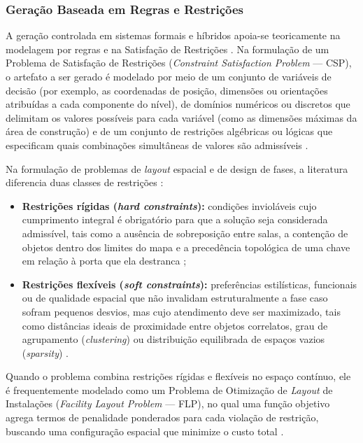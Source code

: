 \subsubsection{Geração Baseada em Regras e Restrições}
\label{sec:geracao_restricoes}

A geração controlada em sistemas formais e híbridos apoia-se teoricamente na modelagem por regras e na Satisfação de Restrições \cite{tanagra, linden2014dungeons, pcgbook, xu2025constraint}. Na formulação de um Problema de Satisfação de Restrições (\textit{Constraint Satisfaction Problem} --- CSP), o artefato a ser gerado é modelado por meio de um conjunto de variáveis de decisão (por exemplo, as coordenadas de posição, dimensões ou orientações atribuídas a cada componente do nível), de domínios numéricos ou discretos que delimitam os valores possíveis para cada variável (como as dimensões máximas da área de construção) e de um conjunto de restrições algébricas ou lógicas que especificam quais combinações simultâneas de valores são admissíveis \cite{tanagra, linden2014dungeons}.

Na formulação de problemas de \textit{layout} espacial e de design de fases, a literatura diferencia duas classes de restrições \cite{xu2025constraint, xu2025databasedrivenframework3dlevel}:
\begin{itemize}
    \item \textbf{Restrições rígidas (\textit{hard constraints}):} condições invioláveis cujo cumprimento integral é obrigatório para que a solução seja considerada admissível, tais como a ausência de sobreposição entre salas, a contenção de objetos dentro dos limites do mapa e a precedência topológica de uma chave em relação à porta que ela destranca \cite{tanagra, sun2024roomplanner, xu2025constraint};
    \item \textbf{Restrições flexíveis (\textit{soft constraints}):} preferências estilísticas, funcionais ou de qualidade espacial que não invalidam estruturalmente a fase caso sofram pequenos desvios, mas cujo atendimento deve ser maximizado, tais como distâncias ideais de proximidade entre objetos correlatos, grau de agrupamento (\textit{clustering}) ou distribuição equilibrada de espaços vazios (\textit{sparsity}) \cite{xu2025constraint, xu2025databasedrivenframework3dlevel}.
\end{itemize}

Quando o problema combina restrições rígidas e flexíveis no espaço contínuo, ele é frequentemente modelado como um Problema de Otimização de \textit{Layout} de Instalações (\textit{Facility Layout Problem} --- FLP), no qual uma função objetivo agrega termos de penalidade ponderados para cada violação de restrição, buscando uma configuração espacial que minimize o custo total \cite{xu2025constraint, xu2025databasedrivenframework3dlevel}.

